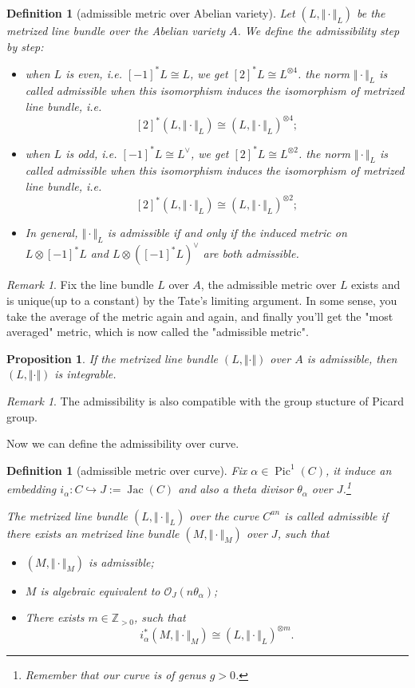 \documentclass[reqno,11pt]{amsart}
\numberwithin{equation}{section}
\theoremstyle{plain}
\newtheorem{proposition}[theorem]{Proposition}
\newtheorem{defn}[theorem]{Definition}
\theoremstyle{plain}
\numberwithin{equation}{section}
\theoremstyle{remark}
\newtheorem{remark}[theorem]{Remark}
\DeclareMathOperator{\Pic}{\operatorname{Pic}}
\DeclareMathOperator{\Jac}{\operatorname{Jac}}
\newcommand{\norm}[1]{\Vert{#1}\Vert}
\begin{document}
\begin{defn}[admissible metric over Abelian variety]
Let $(L,\norm{\cdot}_L)$ be the metrized line bundle over the Abelian variety $A$. We define the admissibility step by step:
\begin{itemize}
\item  when $L$ is even, i.e. $[-1]^*L\cong L$, we get $[2]^*L\cong L^{\otimes 4}$. the norm $\norm{\cdot}_L$ is called admissible when this isomorphism induces the isomorphism of metrized line bundle, i.e.
$$[2]^*(L,\norm{\cdot}_L)\cong (L,\norm{\cdot}_L)^{\otimes 4};$$ 
\item  when $L$ is odd, i.e. $[-1]^*L\cong L^{\vee}$, we get $[2]^*L\cong L^{\otimes 2}$. the norm $\norm{\cdot}_L$ is called admissible when this isomorphism induces the isomorphism of metrized line bundle, i.e.
$$[2]^*(L,\norm{\cdot}_L)\cong (L,\norm{\cdot}_L)^{\otimes 2};$$ 
\item In general, $\norm{\cdot}_L$ is admissible if and only if the induced metric on $L \otimes [-1]^*L$ and $L \otimes ([-1]^*L)^{\vee}$ are both admissible.
\end{itemize}
\end{defn}
\begin{remark}
Fix the line bundle $L$ over $A$, the admissible metric over $L$ exists and is unique(up to a constant) by the Tate's limiting argument. In some sense, you take the average of the metric again and again, and finally you'll get the "most averaged" metric, which is now called the "admissible metric".
\end{remark}
\begin{proposition}
If the metrized line bundle $(L,\norm{\cdot})$ over $A$ is admissible, then $(L,\norm{\cdot})$ is integrable.
\end{proposition}
\begin{remark}
The admissibility is also compatible with the group stucture of Picard group.
\end{remark}
Now we can define the admissibility over curve.
\begin{defn}[admissible metric over curve]
Fix $\alpha \in \Pic^1(C)$, it induce an embedding $i_{\alpha}:C \hookrightarrow J:=\Jac(C)$ and also a theta divisor $\theta_{\alpha}$ over $J$.\footnote{Remember that our curve is of genus $g>0$.} 

The metrized line bundle $(L,\norm{\cdot}_L)$ over the curve $C^{an}$ is called admissible if there exists an metrized line bundle $(M,\norm{\cdot}_M)$ over $J$, such that 
\begin{itemize}
\item $(M,\norm{\cdot}_M)$ is admissible;
\item $M$ is algebraic equivalent to $\mathcal{O}_J(n\theta_{\alpha})$;
\item There exists $m \in \mathbb{Z}_{>0}$, such that $$i_{\alpha}^*(M,\norm{\cdot}_M) \cong (L,\norm{\cdot}_L)^{\otimes m}.$$
\end{itemize}
\end{defn}
\end{document}

